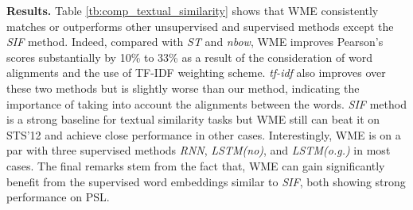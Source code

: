 \documentclass[11pt,a4paper]{article}
\newcommand{\1}{\boldsymbol{1}}
\begin{document}
\vskip0.05in
\noindent
\textbf{Results.} Table \ref{tb:comp_textual_similarity} shows that WME consistently matches or outperforms other unsupervised and supervised methods except the \emph{SIF} method. Indeed, compared with \emph{ST} and \emph{nbow}, WME improves Pearson's scores substantially by 10\% to 33\% as a result of the consideration of word alignments and the use of TF-IDF weighting scheme. \emph{tf-idf} also improves over these two methods but is slightly worse than our method, indicating the importance of taking into account the alignments between the words. \emph{SIF} method is a strong baseline for textual similarity tasks but WME still can beat it on STS'12 and achieve close performance in other cases. Interestingly, WME is on a par with three supervised methods \emph{RNN}, \emph{LSTM(no)}, and \emph{LSTM(o.g.)} in most cases. The final remarks stem from the fact that, WME can gain significantly benefit from the supervised word embeddings similar to \emph{SIF}, both showing strong performance on PSL.



\end{document}
